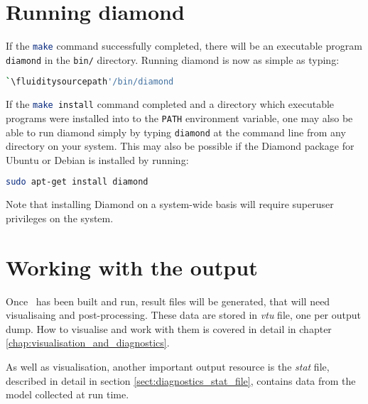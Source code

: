 \section{Running diamond}
\label{sect:running_diamond}

If the \lstinline[language=Bash]+make+ command successfully completed, there will be an
executable program \lstinline[language=Bash]+diamond+ in the
\lstinline[language=Bash]+bin/+ directory. Running diamond is now as simple as
typing:

\begin{lstlisting}[language=Bash]
`\fluiditysourcepath'/bin/diamond
\end{lstlisting}

If the \lstinline[language=Bash]+make install+ command completed and a directory
which executable programs were installed into to the
\lstinline[language=Bash]+PATH+ environment variable, one may also be able to run
diamond simply by typing \lstinline[language=Bash]+diamond+ at the command line
from any directory on your system. This may also be possible if the
Diamond package for Ubuntu or Debian is installed by running:

\begin{lstlisting}[language=Bash]
sudo apt-get install diamond
\end{lstlisting}

Note that installing Diamond on a system-wide basis will require superuser privileges on the system.

\section{Working with the output}
\label{sect:working_with_output}

Once \fluidity\ has been built and run, result files will be generated, that will need visualisaing
and post-processing. These data are stored in \emph{vtu} file, one per output dump. 
How to visualise and work with them is covered in detail in chapter
\ref{chap:visualisation_and_diagnostics}.

As well as visualisation, another important output resource is the \emph{stat} file,
described in detail in section \ref{sect:diagnostics_stat_file}, contains data from the model
collected at run time.

\website

